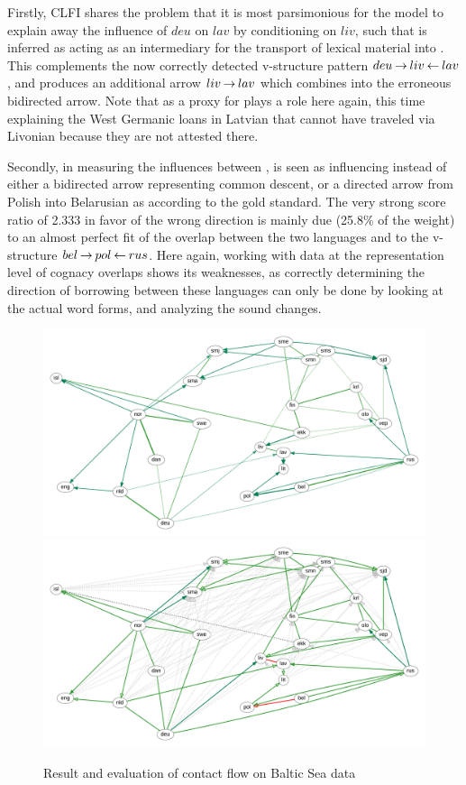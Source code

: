 Firstly, CLFI shares the problem that it is most parsimonious for the model to explain away the influence of $deu$ on $lav$ by conditioning on $liv$,  such that  is inferred as acting as an intermediary for the transport of  lexical material into . This complements the now correctly detected v-structure pattern $deu \kern 2pt\hbox{$\rightarrow$}\kern 2pt liv \kern 2pt\hbox{$\leftarrow$}\kern 2pt lav$, and produces an additional arrow $liv \kern 2pt\hbox{$\rightarrow$}\kern 2pt lav$ which combines into the erroneous bidirected arrow. Note that  as a proxy for  plays a role here again, this time explaining the West Germanic loans in Latvian that cannot have traveled via Livonian because they are not attested there.

Secondly, in measuring the influences between ,  is seen as influencing  instead of either a bidirected arrow representing common descent, or a directed arrow from Polish into Belarusian as according to the gold standard. The very strong score ratio of 2.333 in favor of the wrong direction is mainly due (25.8\% of the weight) to an almost perfect fit of the overlap between the two languages and  to the v-structure $bel \kern 2pt\hbox{$\rightarrow$}\kern 2pt pol \kern 2pt\hbox{$\leftarrow$}\kern 2pt rus$. Here again, working with data at the representation level of cognacy overlaps shows its weaknesses, as correctly determining the direction of borrowing between these languages can only be done by looking at the actual word forms, and analyzing the sound changes.

 \begin{figure}
 \includegraphics[width=\textwidth]{figures/baltic-contact-fs-tss.pdf}
 \vspace*{5mm}
 \includegraphics[width=\textwidth]{figures/baltic-contact-fs-tss-eval.pdf}
 \caption{Result and evaluation of contact flow on Baltic Sea data}
 \label{baltic-result-contact}
 \end{figure}
 
